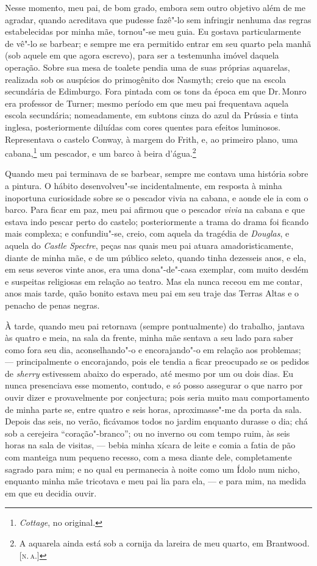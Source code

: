 Nesse momento, meu pai, de bom grado, embora sem outro objetivo além
de me agradar, quando acreditava que pudesse fazê"-lo sem infringir
nenhuma das regras estabelecidas por minha mãe, tornou"-se meu guia. Eu
gostava particularmente de vê"-lo se barbear; e sempre me era permitido
entrar em seu quarto pela manhã (sob aquele em que agora escrevo), para
ser a testemunha imóvel daquela operação. Sobre sua mesa de toalete
pendia uma de suas próprias aquarelas, realizada sob os auspícios do
primogênito dos Nasmyth; creio que na escola secundária de Edimburgo.
Fora pintada com os tons da época em que Dr.\,Monro era professor de Turner;
mesmo período em que meu pai frequentava aquela escola secundária;
nomeadamente, em subtons cinza do azul da Prússia e tinta inglesa,
posteriormente diluídas com cores quentes para efeitos luminosos.
Representava o castelo Conway, à margem do Frith, e, ao primeiro plano,
uma cabana,\footnote{\textit{Cottage}, no original.} um
pescador, e um barco à beira d'água.\footnote{A aquarela ainda está sob a
  cornija da lareira de meu quarto, em Brantwood. {[}\textsc{n.\,a.}{]}}

Quando meu pai terminava de se barbear, sempre me contava uma
história sobre a pintura. O hábito desenvolveu"-se incidentalmente, em
resposta à minha inoportuna curiosidade sobre se o pescador vivia na
cabana, e aonde ele ia com o barco. Para ficar em paz, meu pai afirmou
que o pescador \textit{vivia} na cabana e que estava indo pescar perto do
castelo; posteriormente a trama do drama foi ficando mais complexa; e
confundiu"-se, creio, com aquela da tragédia de \textit{Douglas}, e aquela
do \textit{Castle Spectre}, peças nas quais meu pai atuara
amadoristicamente, diante de minha mãe, e de um público seleto, quando
tinha dezesseis anos, e ela, em seus severos vinte anos, era uma
dona"-de"-casa exemplar, com muito desdém e suspeitas religiosas em
relação ao teatro. Mas ela nunca receou em me contar, anos mais tarde,
quão bonito estava meu pai em seu traje das Terras Altas e o penacho de
penas negras.

À tarde, quando meu pai retornava (sempre pontualmente) do trabalho,
jantava às quatro e meia, na sala da frente, minha mãe sentava a seu
lado para saber como fora seu dia, aconselhando"-o e encorajando"-o em
relação aos problemas; --- principalmente o encorajando, pois ele tendia
a ficar preocupado se os pedidos de \textit{sherry} estivessem abaixo do
esperado, até mesmo por um ou dois dias. Eu nunca presenciava esse
momento, contudo, e só posso assegurar o que narro por ouvir dizer e
provavelmente por conjectura; pois seria muito mau comportamento de
minha parte se, entre quatro e seis horas, aproximasse"-me da porta da
sala. Depois das seis, no verão, ficávamos todos no jardim enquanto
durasse o dia; chá sob a cerejeira ``coração"-branco''; ou no inverno ou
com tempo ruim, às seis horas na sala de visitas, --- bebia minha xícara
de leite e comia a fatia de pão com manteiga num pequeno recesso, com a
mesa diante dele, completamente sagrado para mim; e no qual eu
permanecia à noite como um Ídolo num nicho, enquanto minha mãe tricotava
e meu pai lia para ela, --- e para mim, na medida em que eu decidia
ouvir.

